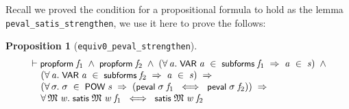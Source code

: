 \documentclass[letterpaper]{article}
\newtheorem{prop}{Proposition}
\renewcommand{\HOLConst}[1]{{\textsf{\upshape\small #1}}}
\newenvironment{holmath}{\begin{displaymath}\begin{array}{l}}{\end{array}\end{displaymath}\ignorespacesafterend}
\begin{document}
Recall we proved the condition for a propositional formula to hold as the lemma \texttt{peval_satis_strengthen}, we use it here to prove the follows:
\begin{prop}[\texttt{equiv0_peval_strengthen}]
\begin{holmath}
  \ensuremath{\HOLTokenTurnstile}\HOLConst{propform}\;\HOLFreeVar{f\sb{\mathrm{1}}}\;\HOLSymConst{\HOLTokenConj{}}\;\HOLConst{propform}\;\HOLFreeVar{f\sb{\mathrm{2}}}\;\HOLSymConst{\HOLTokenConj{}}\;(\HOLSymConst{\HOLTokenForall{}}\HOLBoundVar{a}.\;\HOLConst{VAR}\;\HOLBoundVar{a}\;\HOLSymConst{\HOLTokenIn{}}\;\HOLConst{subforms}\;\HOLFreeVar{f\sb{\mathrm{1}}}\;\HOLSymConst{\HOLTokenImp{}}\;\HOLBoundVar{a}\;\HOLSymConst{\HOLTokenIn{}}\;\HOLFreeVar{s})\;\HOLSymConst{\HOLTokenConj{}}\\
\;\;\;\;\;(\HOLSymConst{\HOLTokenForall{}}\HOLBoundVar{a}.\;\HOLConst{VAR}\;\HOLBoundVar{a}\;\HOLSymConst{\HOLTokenIn{}}\;\HOLConst{subforms}\;\HOLFreeVar{f\sb{\mathrm{2}}}\;\HOLSymConst{\HOLTokenImp{}}\;\HOLBoundVar{a}\;\HOLSymConst{\HOLTokenIn{}}\;\HOLFreeVar{s})\;\HOLSymConst{\HOLTokenImp{}}\\
\;\;\;\;\;(\HOLSymConst{\HOLTokenForall{}}\HOLBoundVar{\ensuremath{\sigma}}.\;\HOLBoundVar{\ensuremath{\sigma}}\;\HOLSymConst{\HOLTokenIn{}}\;\HOLConst{POW}\;\HOLFreeVar{s}\;\HOLSymConst{\HOLTokenImp{}}\;(\HOLConst{peval}\;\HOLBoundVar{\ensuremath{\sigma}}\;\HOLFreeVar{f\sb{\mathrm{1}}}\;\HOLSymConst{\HOLTokenEquiv{}}\;\HOLConst{peval}\;\HOLBoundVar{\ensuremath{\sigma}}\;\HOLFreeVar{f\sb{\mathrm{2}}}))\;\HOLSymConst{\HOLTokenImp{}}\\
\;\;\;\;\;\HOLSymConst{\HOLTokenForall{}}\HOLBoundVar{\ensuremath{\mathfrak{M}}}\;\HOLBoundVar{w}.\;\HOLConst{satis}\;\HOLBoundVar{\ensuremath{\mathfrak{M}}}\;\HOLBoundVar{w}\;\HOLFreeVar{f\sb{\mathrm{1}}}\;\HOLSymConst{\HOLTokenEquiv{}}\;\HOLConst{satis}\;\HOLBoundVar{\ensuremath{\mathfrak{M}}}\;\HOLBoundVar{w}\;\HOLFreeVar{f\sb{\mathrm{2}}}
\end{holmath}
\end{prop}
\end{document}
